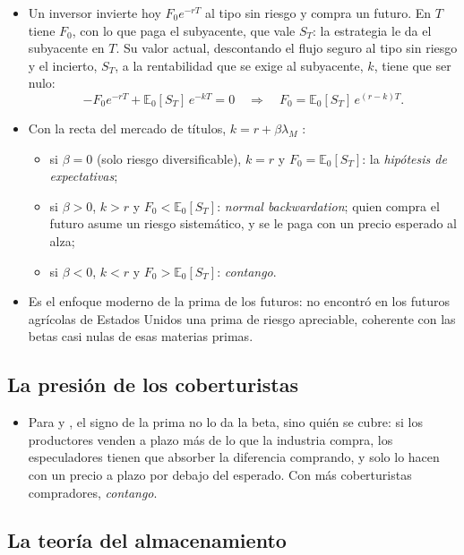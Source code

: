 \documentclass[11pt]{article}
\begin{document}
\begin{itemize}
\item Un inversor invierte hoy $F_0e^{-rT}$ al tipo sin riesgo y compra un futuro. En $T$ tiene $F_0$, con lo que paga el subyacente, que vale $S_T$: la estrategia le da el subyacente en $T$. Su valor actual, descontando el flujo seguro al tipo sin riesgo y el incierto, $S_T$, a la rentabilidad que se exige al subyacente, $k$, tiene que ser nulo\nocite{Hull2022Options}:
  \[
  -F_0e^{-rT}+\mathbb{E}_0[S_T]\,e^{-kT}=0\quad\Longrightarrow\quad F_0=\mathbb{E}_0[S_T]\,e^{(r-k)T}.
  \]
\item Con la recta del mercado de títulos, $k=r+\beta\lambda_M$ :
  \begin{itemize}
  \item si $\beta=0$ (solo riesgo diversificable), $k=r$ y $F_0=\mathbb{E}_0[S_T]$: la \emph{hipótesis de expectativas};
  \item si $\beta>0$, $k>r$ y $F_0<\mathbb{E}_0[S_T]$: \emph{normal backwardation}; quien compra el futuro asume un riesgo sistemático, y se le paga con un precio esperado al alza;
  \item si $\beta<0$, $k<r$ y $F_0>\mathbb{E}_0[S_T]$: \emph{contango}.
  \end{itemize}
\item Es el enfoque moderno de la prima de los futuros: \textcite{Dusak1973Futures} no encontró en los futuros agrícolas de Estados Unidos una prima de riesgo apreciable, coherente con las betas casi nulas de esas materias primas\nocite{BodieKaneMarcus2021Investments}.
\end{itemize}

\subsection{La presión de los coberturistas}

\begin{itemize}
\item Para \textcite{Keynes1930Treatise} y \textcite{Hicks1939Value}, el signo de la prima no lo da la beta, sino quién se cubre: si los productores venden a plazo más de lo que la industria compra, los especuladores tienen que absorber la diferencia comprando, y solo lo hacen con un precio a plazo por debajo del esperado. Con más coberturistas compradores, \emph{contango}.
\end{itemize}

\subsection{La teoría del almacenamiento}
\end{document}
